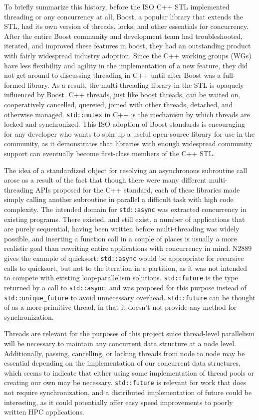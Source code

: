 To briefly summarize this history, before the ISO C++ STL  implemented threading or any concurrency at all, Boost, a popular library that extends the STL, had its own version of threads, locks, and other essentials for concurrency. After the entire Boost community and development team had troubleshooted, iterated, and improved these features in boost, they had an outstanding product with fairly widespread industry adoption. Since the C++ working groups (WGs) have less flexibility and agility in the implementation of a new feature, they did not get around to discussing threading in C++ until after Boost was a full-formed library. As a result, the multi-threading library in the STL is opaquely influenced by Boost. C++ threads, just like boost threads, can be waited on, cooperatively cancelled, quereied, joined with other threads, detached, and otherwise managed. \texttt{std::mutex} in C++ is the mechanism by which threads are locked and synchronized. This ISO adoption of Boost standards is encouraging for any developer who wants to spin up a useful open-source library for use in the community, as it demonstrates that libraries with enough widespread community support can eventually become first-class members of the C++ STL. 

The idea of a standardized object for resolving an asynchronous subroutine call arose as a result of the fact that though there were many different multi-threading APIs proposed for the C++ standard, each of these libraries made simply calling another subroutine in parallel a difficult task with high code complexity. The intended domain for \texttt{std::async} was extracted concurrency in existing programs. There existed, and still exist, a number of applications that are purely sequential, having been written before multi-threading was widely possible, and inserting a function call in a couple of places is usually a more realistic goal than rewriting entire applications with concurrency in mind. N2889 gives the example of quicksort: \texttt{std::async} would be appropriate for recursive calls to quicksort, but not to the iteration in a partition, as it was not intended to compete with existing loop-parallelism solutions. \texttt{std::future} is the type returned by a call to \texttt{std::async}, and was proposed for this purpose instead of \texttt{std::unique\_future} to avoid unnecessary overhead. \texttt{std::future} can be thought of as a more primitive thread, in that it doesn't not provide any method for synchronization. 

Threads are relevant for the purposes of this project since thread-level parallelism will be necessary to maintain any concurrent data structure at a node level. Additionally, passing, cancelling, or locking threads from node to node may be essential depending on the implementation of our concurrent data structures, which seems to indicate that either using some implementation of thread pools or creating our own may be necessary. \texttt{std::future} is relevant for work that does not require synchronization, and a distributed implementation of future could be interesting, as it could potentially offer easy speed improvements to poorly written HPC applications. 


